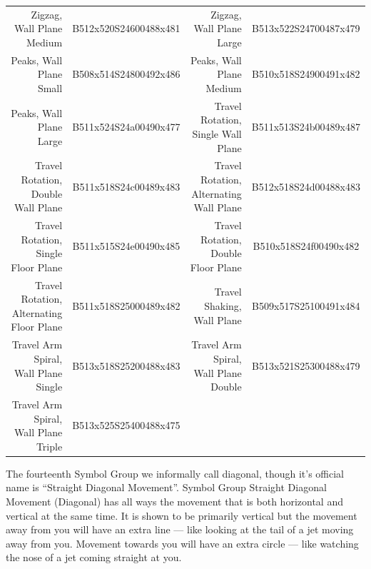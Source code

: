 \documentclass{article}
\begin{document}
\begin{center}
\begin{tabular}{rcrc}
Zigzag, Wall Plane Medium                 &B512x520S24600488x481&Zigzag, Wall Plane Large                    &B513x522S24700487x479\\
Peaks, Wall Plane Small                   &B508x514S24800492x486&Peaks, Wall Plane Medium                    &B510x518S24900491x482\\
Peaks, Wall Plane Large                   &B511x524S24a00490x477&Travel Rotation, Single Wall Plane          &B511x513S24b00489x487\\
Travel Rotation, Double Wall Plane        &B511x518S24c00489x483&Travel Rotation, Alternating Wall Plane     &B512x518S24d00488x483\\
Travel Rotation, Single Floor Plane       &B511x515S24e00490x485&Travel Rotation, Double Floor Plane         &B510x518S24f00490x482\\
Travel Rotation, Alternating Floor Plane  &B511x518S25000489x482&Travel Shaking, Wall Plane                  &B509x517S25100491x484\\
Travel Arm Spiral, Wall Plane Single      &B513x518S25200488x483&Travel Arm Spiral, Wall Plane Double        &B513x521S25300488x479\\
Travel Arm Spiral, Wall Plane Triple      &B513x525S25400488x475\\
\end{tabular}
\end{center}

The fourteenth Symbol Group we informally call diagonal, though it's official name is ``Straight Diagonal Movement''.
Symbol Group Straight Diagonal Movement (Diagonal) has all ways the movement that is both horizontal and vertical at the same time.
It is shown to be primarily vertical but the movement away from you will have an extra line --- like looking at the tail of a jet moving away from you.
Movement towards you will have an extra circle --- like watching the nose of a jet coming straight at you.
\end{document}
